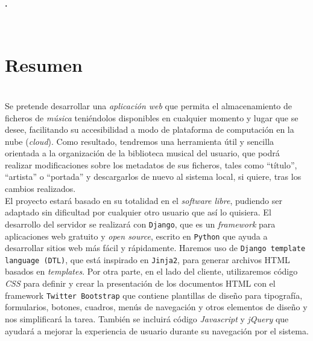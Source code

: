 

\begin{center}
{\large\bfseries \myTitle. \mySubTitle}\\
\end{center}
\begin{center}
\myName\\
\end{center}

\section*{Resumen}

\bigskip
{}\\

Se pretende desarrollar una \textit{aplicación web} que permita el almacenamiento de ficheros de \textit{música} teniéndolos disponibles en cualquier momento y lugar que se desee, facilitando su accesibilidad a modo de plataforma de computación en la nube (\textit{cloud}). Como resultado, tendremos una herramienta útil y sencilla orientada a la organización de la biblioteca musical del usuario, que podrá realizar modificaciones sobre los metadatos de sus ficheros, tales como ``título'', ``artista'' o ``portada'' y descargarlos de nuevo al sistema local, si quiere, tras los cambios realizados. \\

El proyecto estará basado en su totalidad en el \textit{software libre}, pudiendo ser adaptado sin dificultad por cualquier otro usuario que así lo quisiera. El desarrollo del servidor se realizará con {\tt Django}, que es un \textit{framework} para aplicaciones web gratuito y \textit{open source}, escrito en {\tt Python} que ayuda a desarrollar sitios web más fácil y rápidamente. Haremos uso de {\tt Django template language (DTL)}, que está inspirado en {\tt Jinja2}, para generar archivos HTML basados en \textit{templates}. Por otra parte, en el lado del cliente, utilizaremos código \textit{CSS} para definir y crear la presentación de los documentos HTML con el framework {\tt Twitter Bootstrap} que contiene plantillas de diseño para tipografía, formularios, botones, cuadros, menús de navegación y otros elementos de diseño y nos simplificará la tarea. También se incluirá código \textit{Javascript} y \textit{jQuery} que ayudará a mejorar la experiencia de usuario durante su navegación por el sistema. \\

